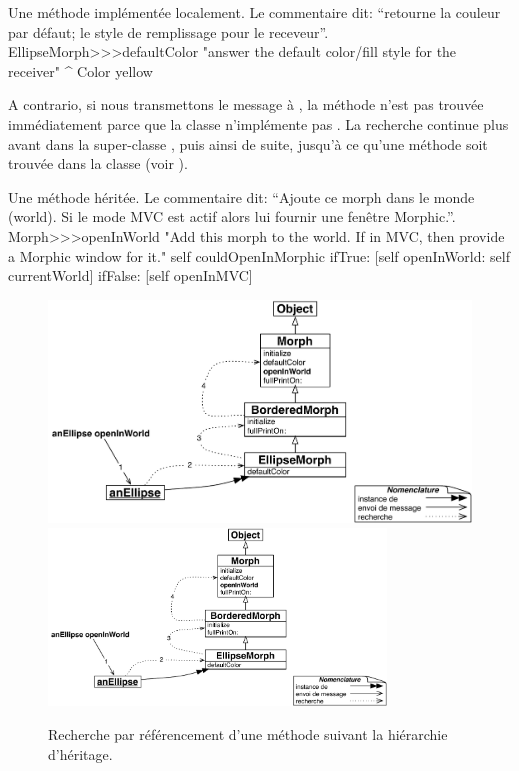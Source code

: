 \documentclass[a4paper,10pt,twoside]{book}
\begin{document}
\begin{method}[defaultColor]{Une m\'ethode impl\'ement\'ee localement. Le commentaire dit: ``retourne la couleur par d\'efaut; le style de remplissage pour le receveur''.}
EllipseMorph>>>defaultColor
	"answer the default color/fill style for the receiver"
	^ Color yellow
\end{method}

A contrario, si nous transmettons le message  \`a \mbox{,} la m\'ethode n'est pas trouv\'ee imm\'ediatement parce que la classe  n'impl\'emente pas .
La recherche continue plus avant dans la super-classe \mbox{,} puis ainsi de suite, jusqu'\`a ce qu'une m\'ethode  soit trouv\'ee dans la classe  (voir ).

\begin{method}[openInWorld]{Une m\'ethode h\'erit\'ee. Le commentaire dit: ``Ajoute ce morph dans le monde (world). Si le mode MVC est actif alors lui fournir une fen\^etre Morphic.''.}
Morph>>>openInWorld
	"Add this morph to the world.  If in MVC, then provide a Morphic window for it."
	self couldOpenInMorphic
		ifTrue: [self openInWorld: self currentWorld]
		ifFalse: [self openInMVC]
\end{method}

\begin{figure}[htb]
\begin{center}
\ifluluelse
	{\includegraphics[width=\textwidth]{openInWorldLookup}}
	{\includegraphics[width=0.8\textwidth]{openInWorldLookup}}
\caption{Recherche par r\'ef\'erencement d'une m\'ethode suivant la hi\'erarchie d'h\'eritage.\label{fig:openInWorldLookup}}
\end{center}
\end{figure}
\end{document}
